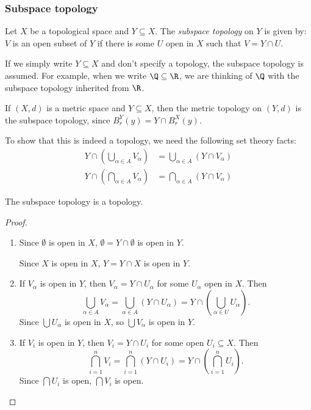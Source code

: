 \documentclass[a4paper]{article}
\begin{document}
\subsubsection{Subspace topology}
\begin{defi}
  Let $X$ be a topological space and $Y\subseteq X$. The \emph{subspace topology} on $Y$ is given by: $V$ is an open subset of $Y$ if there is some $U$ open in $X$ such that $V = Y\cap U$.
\end{defi}
If we simply write $Y\subseteq X$ and don't specify a topology, the subspace topology is assumed. For example, when we write $\Q\subseteq \R$, we are thinking of $\Q$ with the subspace topology inherited from $\R$.

\begin{eg}
  If $(X, d)$ is a metric space and $Y\subseteq X$, then the metric topology on $(Y, d)$ is the subspace topology, since $B_r^Y(y) = Y\cap B_r^X(y)$.
\end{eg}

To show that this is indeed a topology, we need the following set theory facts:
\begin{align*}
  Y\cap \left(\bigcup_{\alpha \in A}V_\alpha\right) &= \bigcup_{\alpha \in A}\left(Y\cap V_\alpha\right)\\
  Y\cap \left(\bigcap_{\alpha\in A}V_\alpha\right) &= \bigcap_{\alpha\in A}(Y\cap V_\alpha)
\end{align*}

\begin{prop}
  The subspace topology is a topology.
\end{prop}

\begin{proof}\leavevmode
  \begin{enumerate}
    \item Since $\emptyset$ is open in $X$, $\emptyset = Y\cap \emptyset$ is open in $Y$.

      Since $X$ is open in $X$, $Y = Y\cap X$ is open in $Y$.
    \item If $V_\alpha$ is open in $Y$, then $V_\alpha = Y\cap U_\alpha$ for some $U_\alpha$ open in $X$. Then
      \[
        \bigcup_{\alpha\in A}V_\alpha = \bigcup_{\alpha\in A}\left(Y\cap U_\alpha\right) = Y\cap \left(\bigcup_{\alpha\in U}U_\alpha\right).
      \]
      Since $\bigcup U_\alpha$ is open in $X$, so $\bigcup V_\alpha$ is open in $Y$.
    \item If $V_i$ is open in $Y$, then $V_i = Y\cap U_i$ for some open $U_i\subseteq X$. Then
      \[
        \bigcap_{i = 1}^n V_i = \bigcap_{i = 1}^n \left(Y\cap U_i\right) = Y\cap \left(\bigcap_{i = 1}^n U_i\right).
      \]
      Since $\bigcap U_i$ is open, $\bigcap V_i$ is open.
  \end{enumerate}
\end{proof}
\end{document}
